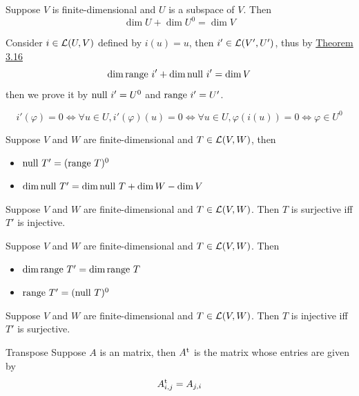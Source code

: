 \documentclass[12pt,a4paper]{article}
\begin{document}
    \begin{prop}\label{3.71}
        Suppose $V$ is finite-dimensional and $U$ is a subspace of $V$. Then
        $$
        \dim U+\dim U^0=\dim V
        $$
    \end{prop}
    \begin{remark}
        Consider $i\in\mathcal{L}(U,V)$ defined by $i(u)=u$, then $i'\in\mathcal{L}(V',U')$, thus by \hyperref[3.16]{Theorem 3.16}
        $$
        \dim\operatorname{range\,}{i'}+\dim\operatorname{null\,}{i'}=\dim V
        $$
        then we prove it by $\operatorname{null\,}{i'}=U^0$ and $\operatorname{range\,}{i'}=U'$.

        $$i'(\varphi)=0\iff\forall u\in U, i'(\varphi)(u)=0\iff\forall u\in U,\varphi(i(u))=0\iff\varphi\in U^0$$
    \end{remark}
    \hfill

    \begin{prop}\label{3.72}
        Suppose $V$ and $W$ are finite-dimensional and $T\in\mathcal{L}(V,W)$, then
        \begin{itemize}
            \item $\operatorname{null\,} T'=(\operatorname{range\,} T)^0$
            \item $\dim\operatorname{null\,} T'=\dim \operatorname{null\,} T+\dim W-\dim V$
        \end{itemize}
    \end{prop}
    \begin{prop}
        Suppose $V$ and $W$ are finite-dimensional and $T\in\mathcal{L}(V,W)$. Then $T$ is surjective iff $T'$ is injective.
    \end{prop}
    \hfill
    
    \begin{prop}\label{3.74}
        Suppose $V$ and $W$ are finite-dimensional and $T\in\mathcal{L}(V,W)$. Then
        \begin{itemize}
            \item $\dim\operatorname{range\,} T'=\dim\operatorname{range\,} T$
            \item $\operatorname{range\,} T'=(\operatorname{null\,} T)^0$
        \end{itemize}
    \end{prop}
    \begin{prop}
        Suppose $V$ and $W$ are finite-dimensional and $T\in\mathcal{L}(V,W)$. Then $T$ is injective iff $T'$ is surjective.
    \end{prop}
    \hfill

    \begin{defi}{Transpose}%
    Suppose $A$ is an  matrix, then $A^\mathrm{t}$ is the  matrix whose entries are given by
    $$
    A^\mathrm{t}_{i,j}=A_{j,i}
    $$
    \end{defi}
    \hfill
\end{document}
